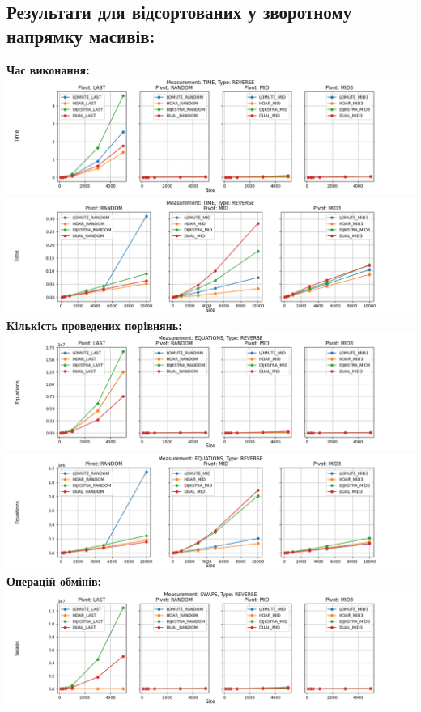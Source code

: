 \documentclass{article}
\begin{document}
    \subsection{Результати для відсортованих у зворотному напрямку масивів:}
    \textbf{Час виконання:}
    \newline
        \includegraphics[scale=0.5]{reverse_Time_6_numbers.png}
        \includegraphics[scale=0.5]{reverse_Time_3_pivots_7_numbers.png}
    \textbf{Кiлькiсть проведених порiвнянь:}
    \newline
        \includegraphics[scale=0.5]{reverse_Equations_6_numbers.png}
        \includegraphics[scale=0.5]{reverse_Equations_3_pivots_7_numbers.png}
        \newline
    \textbf{Операцiй обмінів:}
    \newline
        \includegraphics[scale=0.5]{reverse_Swaps_6_numbers.png}
\end{document}
